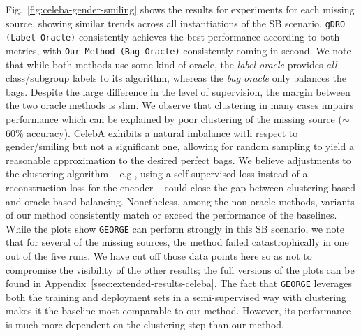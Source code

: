 Fig.~\ref{fig:celeba-gender-smiling} shows the results for experiments for each missing source,
showing similar trends across all instantiations of the SB scenario. 
%
\texttt{gDRO (Label Oracle)} consistently achieves the best performance according to both metrics,
with \texttt{Our Method (Bag Oracle)} consistently coming in second. 
%
We note that while both methods use some kind of oracle, the \emph{label oracle} provides
\emph{all} class/subgroup labels to its algorithm, whereas the \emph{bag oracle} only balances the
bags. 
%
Despite the large difference in the level of supervision, the margin between the two oracle methods
is slim. 
%
We observe that clustering in many cases impairs performance which can be explained by poor
clustering of the missing source ($\sim$60\% accuracy).
%
CelebA exhibits a natural imbalance with respect to gender/smiling but not a significant one,
allowing for random sampling to yield a reasonable approximation to the desired perfect bags. 
%
We believe adjustments to the clustering algorithm -- e.g., using a self-supervised loss instead of
a reconstruction loss for the encoder -- could close the gap between clustering-based and
oracle-based balancing. 
%
Nonetheless, among the non-oracle methods, variants of our method
consistently match or exceed the performance of the baselines. 
%
While the plots show \texttt{GEORGE} can perform strongly in this SB scenario, we note that for
several of the missing sources, the method failed catastrophically in one out of the five runs.
%
We have cut off those data points here so as not to compromise the visibility of the other results;
the full versions of the plots can be found in Appendix~\ref{ssec:extended-results-celeba}.
%
The fact that \texttt{GEORGE} leverages both the training and deployment sets in a semi-supervised
way with clustering makes it the baseline most comparable to our method.
%
However, its performance is much more dependent on the clustering step than our method.


